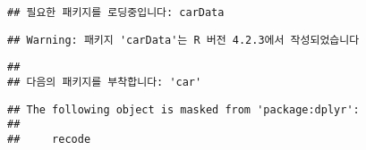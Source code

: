 \documentclass{article}
\begin{document}
\begin{verbatim}
## 필요한 패키지를 로딩중입니다: carData
\end{verbatim}

\begin{verbatim}
## Warning: 패키지 'carData'는 R 버전 4.2.3에서 작성되었습니다
\end{verbatim}

\begin{verbatim}
## 
## 다음의 패키지를 부착합니다: 'car'
\end{verbatim}

\begin{verbatim}
## The following object is masked from 'package:dplyr':
## 
##     recode
\end{verbatim}

\begin{Shaded}
\begin{Highlighting}[]
\NormalTok{(\{}
\OtherTok{=}\SpecialCharTok{::}\SpecialCharTok{$}\NormalTok{(}\NormalTok{)}
\SpecialCharTok{::}\SpecialCharTok{$}\NormalTok{(} 
\OtherTok{=} 
    \NormalTok{ (}\NormalTok{(}
\NormalTok{  \})}
\NormalTok{\})}
\end{Highlighting}
\end{Shaded}

\begin{Shaded}
\begin{Highlighting}[]
\OtherTok{\textless{}{-}} 
\OtherTok{=} 
\OtherTok{=} 
\end{Highlighting}
\end{Shaded}
\end{document}
